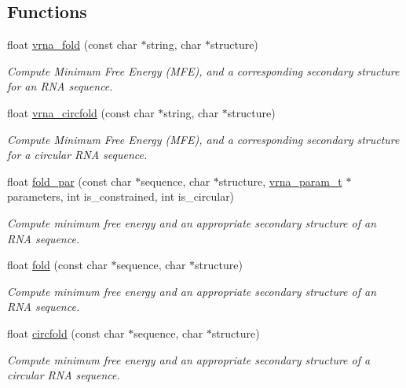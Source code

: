 \subsection*{Functions}
\begin{DoxyCompactItemize}
\item 
float \hyperlink{group__mfe__fold__single_gae7ca49ffb3086f145da36c964a7cec64}{vrna\+\_\+fold} (const char $\ast$string, char $\ast$structure)
\begin{DoxyCompactList}\small\item\em Compute Minimum Free Energy (M\+F\+E), and a corresponding secondary structure for an R\+N\+A sequence. \end{DoxyCompactList}\item 
float \hyperlink{group__mfe__fold__single_gaa0f5bf321038f404b36a6147bdae4154}{vrna\+\_\+circfold} (const char $\ast$string, char $\ast$structure)
\begin{DoxyCompactList}\small\item\em Compute Minimum Free Energy (M\+F\+E), and a corresponding secondary structure for a circular R\+N\+A sequence. \end{DoxyCompactList}\item 
float \hyperlink{group__mfe__fold__single_ga2bc41df5d71fee6fd8da9904ee65d8fb}{fold\+\_\+par} (const char $\ast$sequence, char $\ast$structure, \hyperlink{group__energy__parameters_ga8a69ca7d787e4fd6079914f5343a1f35}{vrna\+\_\+param\+\_\+t} $\ast$parameters, int is\+\_\+constrained, int is\+\_\+circular)
\begin{DoxyCompactList}\small\item\em Compute minimum free energy and an appropriate secondary structure of an R\+N\+A sequence. \end{DoxyCompactList}\item 
float \hyperlink{group__mfe__fold__single_gaadafcb0f140795ae62e5ca027e335a9b}{fold} (const char $\ast$sequence, char $\ast$structure)
\begin{DoxyCompactList}\small\item\em Compute minimum free energy and an appropriate secondary structure of an R\+N\+A sequence. \end{DoxyCompactList}\item 
float \hyperlink{group__mfe__fold__single_ga4ac63ab3e8d9a80ced28b8052d94e423}{circfold} (const char $\ast$sequence, char $\ast$structure)
\begin{DoxyCompactList}\small\item\em Compute minimum free energy and an appropriate secondary structure of a circular R\+N\+A sequence. \end{DoxyCompactList}\item 

\end{DoxyCompactItemize}
